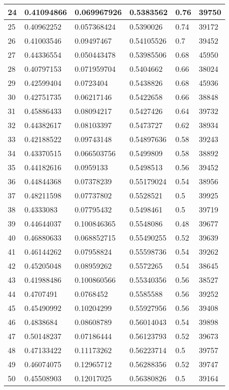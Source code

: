 \begin{longtable}{|l|l|l|l|l|l|}
24 & 0.41094866 & 0.069967926 & 0.5383562 & 0.76 & 39750 \\ \hline 
25 & 0.40962252 & 0.057368424 & 0.5390026 & 0.74 & 39172 \\ \hline 
26 & 0.41003546 & 0.09497467 & 0.54105526 & 0.7 & 39452 \\ \hline 
27 & 0.44336554 & 0.050443478 & 0.53985506 & 0.68 & 45950 \\ \hline 
28 & 0.40797153 & 0.071959704 & 0.5404662 & 0.66 & 38024 \\ \hline 
29 & 0.42599404 & 0.0723404 & 0.5438826 & 0.68 & 45936 \\ \hline 
30 & 0.42751735 & 0.06217146 & 0.5422658 & 0.66 & 38848 \\ \hline 
31 & 0.45886433 & 0.08094217 & 0.5427426 & 0.64 & 39732 \\ \hline 
32 & 0.44382617 & 0.08103397 & 0.5473727 & 0.62 & 38934 \\ \hline 
33 & 0.42188522 & 0.09743148 & 0.54897636 & 0.58 & 39243 \\ \hline 
34 & 0.43370515 & 0.066503756 & 0.5499809 & 0.58 & 38892 \\ \hline 
35 & 0.44182616 & 0.0959133 & 0.5498513 & 0.56 & 39452 \\ \hline 
36 & 0.44844368 & 0.07378239 & 0.55179024 & 0.54 & 38956 \\ \hline 
37 & 0.48211598 & 0.07737802 & 0.5528521 & 0.5 & 39925 \\ \hline 
38 & 0.4333083 & 0.07795432 & 0.5498461 & 0.5 & 39719 \\ \hline 
39 & 0.44644037 & 0.100846365 & 0.5548086 & 0.48 & 39677 \\ \hline 
40 & 0.46880633 & 0.068852715 & 0.55490255 & 0.52 & 39639 \\ \hline 
41 & 0.46144262 & 0.07958824 & 0.55598736 & 0.54 & 39262 \\ \hline 
42 & 0.45205048 & 0.08959262 & 0.5572265 & 0.54 & 38645 \\ \hline 
43 & 0.41988486 & 0.100860566 & 0.55340356 & 0.56 & 38527 \\ \hline 
44 & 0.4707491 & 0.0768452 & 0.5585588 & 0.56 & 39252 \\ \hline 
45 & 0.45490992 & 0.10204299 & 0.55927956 & 0.56 & 39408 \\ \hline 
46 & 0.4838684 & 0.08608789 & 0.56014043 & 0.54 & 39898 \\ \hline 
47 & 0.50148237 & 0.07186444 & 0.56123793 & 0.52 & 39673 \\ \hline 
48 & 0.47133422 & 0.11173262 & 0.56223714 & 0.5 & 39757 \\ \hline 
49 & 0.46074075 & 0.12965712 & 0.56288356 & 0.52 & 39747 \\ \hline 
50 & 0.45508903 & 0.12017025 & 0.56380826 & 0.5 & 39164 \\ \hline 
\end{longtable}